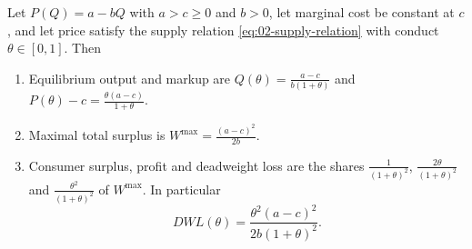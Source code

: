 \begin{proposition}\label{prop:02-dwl-linear}
Let $P(Q) = a - bQ$ with $a > c \ge 0$ and $b > 0$, let marginal cost be constant at $c$, and let price satisfy the
supply relation \eqref{eq:02-supply-relation} with conduct $\theta \in [0, 1]$. Then
\begin{enumerate}[label=(\roman*)]
\item Equilibrium output and markup are $Q(\theta) = \frac{a - c}{b(1 + \theta)}$ and
      $P(\theta) - c = \frac{\theta (a - c)}{1 + \theta}$.
\item Maximal total surplus is $W^{\max} = \frac{(a - c)^2}{2b}$.
\item Consumer surplus, profit and deadweight loss are the shares $\frac{1}{(1 + \theta)^2}$,
      $\frac{2\theta}{(1 + \theta)^2}$ and $\frac{\theta^2}{(1 + \theta)^2}$ of $W^{\max}$. In particular
      \begin{equation}\label{eq:02-dwl-linear}
      \mathit{DWL}(\theta) = \frac{\theta^2 (a - c)^2}{2b(1 + \theta)^2}.
      \end{equation}
\end{enumerate}
\end{proposition}


